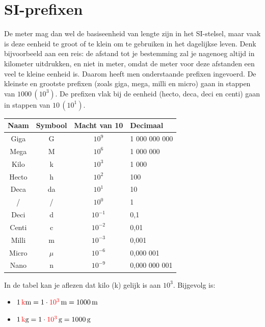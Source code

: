 \documentclass{ximera}
\begin{document}
\section{SI-prefixen}
De meter mag dan wel de basiseenheid van lengte zijn in het SI-stelsel, maar vaak is deze eenheid te groot of te klein om te gebruiken in het dagelijkse leven. Denk bijvoorbeeld aan een reis: de afstand tot je bestemming zal je nagenoeg altijd in kilometer uitdrukken, en niet in meter, omdat de meter voor deze afstanden een veel te kleine eenheid is. Daarom heeft men onderstaande prefixen ingevoerd. De kleinste en grootste prefixen (zoals giga, mega, milli en micro) gaan in stappen van $1000 \, (10^{3})$. De prefixen vlak bij de eenheid (hecto, deca, deci en centi) gaan in stappen van $10 \, (10^{1})$.

\begin{center}
    \begin{tabular}{ |c|c|c|l| } 
    \hline
    \textbf{Naam} & \textbf{Symbool} & \textbf{Macht van 10} & \textbf{Decimaal} \\
    \hline
    Giga & G & $10^{9}$ & 1 000 000 000 \\
    \hline
    Mega & M & $10^{6}$ & 1 000 000 \\
    \hline
    Kilo & k & $10^{3}$ & 1 000 \\
    \hline
    Hecto & h & $10^{2}$ & 100 \\
    \hline
    Deca & da & $10^{1}$ & 10 \\
    \hline
    / & / & $10^{0}$ & 1 \\
    \hline
    Deci & d & $10^{-1}$ & 0,1 \\
    \hline
    Centi & c & $10^{-2}$ & 0,01 \\
    \hline
    Milli & m & $10^{-3}$ & 0,001 \\
    \hline
    Micro & $\mu$ & $10^{-6}$ & 0,000 001 \\
    \hline
    Nano & n & $10^{-9}$ & 0,000 000 001 \\
    \hline
    \end{tabular}
\end{center}

\begin{example}[title={Rekenen met prefixen}]\nl
    In de tabel kan je aflezen dat kilo (k) gelijk is aan $10^{3}$. Bijgevolg is:
    \begin{itemize}
    \item $1 \, \textcolor{red}{\mathrm{k}}\mathrm{m} = 1 \cdot \textcolor{red}{10^{3}} \, \mathrm{m} = 1000 \, \mathrm{m}$
    \item $1 \, \textcolor{red}{\mathrm{k}}\mathrm{g} = 1 \cdot \textcolor{red}{10^{3}} \, \mathrm{g} = 1000 \, \mathrm{g}$
    \end{itemize}
\end{example}
\end{document}
